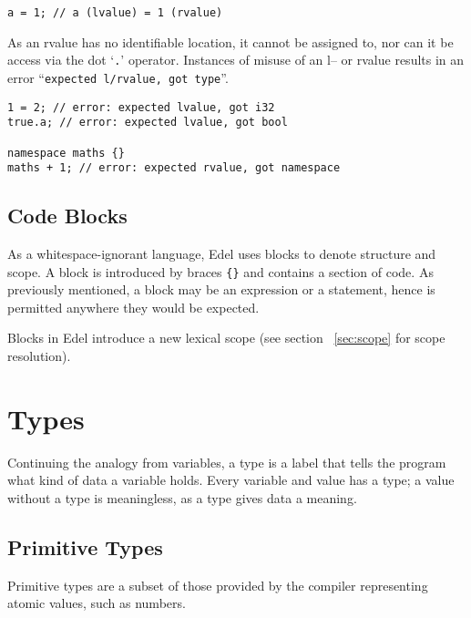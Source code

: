 \documentclass{article}
\begin{document}
    \begin{lstlisting}[language=CustomLang]
a = 1; // a (lvalue) = 1 (rvalue)
    \end{lstlisting}

    As an rvalue has no identifiable location, it cannot be assigned to, nor can it be access via the dot `\texttt{.}' operator.
    Instances of misuse of an l-- or rvalue results in an error ``\texttt{expected l/rvalue, got type}''.

    \begin{lstlisting}[language=CustomLang]
1 = 2; // error: expected lvalue, got i32
true.a; // error: expected lvalue, got bool

namespace maths {}
maths + 1; // error: expected rvalue, got namespace
    \end{lstlisting}

    \subsection{Code Blocks}\label{subsec:code-blocks}

    As a whitespace-ignorant language, Edel uses blocks to denote structure and scope.
    A block is introduced by braces \texttt{\{\}} and contains a section of code.
    As previously mentioned, a block may be an expression or a statement, hence is permitted anywhere they would be expected.

    Blocks in Edel introduce a new lexical scope (see section ~\ref{sec:scope} for scope resolution).

    \section{Types}\label{sec:types}

    Continuing the analogy from variables, a type is a label that tells the program what kind of data a variable holds.
    Every variable and value has a type; a value without a type is meaningless, as a type gives data a meaning.

    \subsection{Primitive Types}

    Primitive types are a subset of those provided by the compiler representing atomic values, such as numbers.
\end{document}
